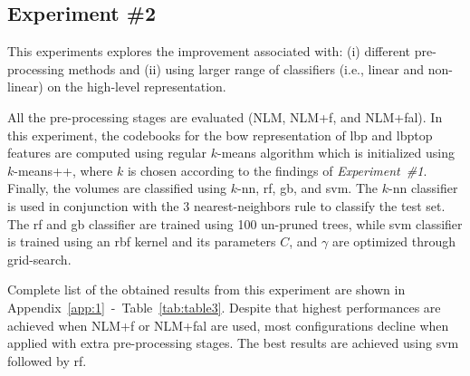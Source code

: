 \subsection{Experiment \#2}\label{subsec:exp2}
%
%
%
%

This experiments explores the improvement associated with: (i) different pre-processing methods and (ii) using larger range of classifiers (i.e., linear and non-linear) on the high-level representation.

All the pre-processing stages are evaluated (NLM, NLM+\acs{f}, and NLM+\acs{fal}).
In this experiment, the codebooks for the \ac{bow} representation of \ac{lbp} and \ac{lbptop} features are computed using regular $k$-means algorithm which is initialized using $k$-means++, where $k$ is chosen according to the findings of \emph{Experiment~\#1}.
Finally, the volumes are classified using $k$-\ac{nn}, \ac{rf}, \ac{gb}, and \ac{svm}.
The $k$-\ac{nn} classifier is used in conjunction with the 3 nearest-neighbors rule to classify the test set.
The \ac{rf} and \ac{gb} classifier are trained using 100 un-pruned trees, while \ac{svm} classifier is trained using an \ac{rbf} kernel and its parameters $C$, and $\gamma$ are optimized through grid-search.

Complete list of the obtained results from this experiment are shown in Appendix~\ref{app:1}~-~Table~\ref{tab:table3}.
Despite that highest performances are achieved when NLM+\acs{f} or NLM+\acs{fal} are used, most configurations decline when applied with extra pre-processing stages.
The best results are achieved using \ac{svm} followed by \ac{rf}.

